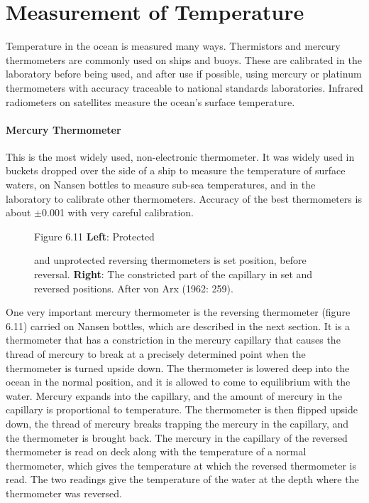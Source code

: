 \section{Measurement of Temperature}
Temperature in the ocean
is measured many ways. Thermistors and mercury thermometers
are commonly used on ships and buoys. These are calibrated in the
laboratory before being used, and after use if possible, using
mercury or platinum thermometers with accuracy traceable
to national standards laboratories. Infrared radiometers on
satellites measure the ocean's surface temperature.

\paragraph{Mercury Thermometer} This is the most widely used,
non-electronic thermometer. It was widely
used in buckets dropped over the side of a ship to measure the
temperature of surface waters, on Nansen bottles to measure sub-sea
temperatures, and in the laboratory to calibrate other
thermometers. Accuracy of the best thermometers is about
$\pm$0.001 with very careful calibration.

\begin{figure}[t!]
\footnotesize
Figure 6.11 \textbf{Left}: Protected \rule{0mm}{4ex} and
unprotected reversing thermometers is set position, before
reversal.
\textbf{Right}: The constricted part of the capillary in set and reversed
positions. After von Arx (1962: 259).
\label{fig:thermometer}
\vspace{-3ex}
\end{figure}

One very important mercury thermometer is the reversing
thermometer (figure 6.11) carried on Nansen bottles, which are
described in the next section. It is a thermometer that has a constriction in the mercury
capillary that causes the thread of mercury to break at a precisely determined point when the
thermometer is turned upside down. The thermometer is lowered deep into the ocean in the
normal position, and it is allowed to come to equilibrium with the water. Mercury
expands into the capillary, and the amount of mercury in the capillary is
proportional to temperature. The thermometer is then flipped upside down, the
thread of mercury breaks trapping the mercury in the capillary, and the
thermometer is brought back. The mercury in the capillary of the reversed
thermometer is read on deck along with the temperature of a normal thermometer,
which gives the temperature at which the reversed thermometer is read. The two
readings give the temperature of the water at the depth where the thermometer
was reversed.

